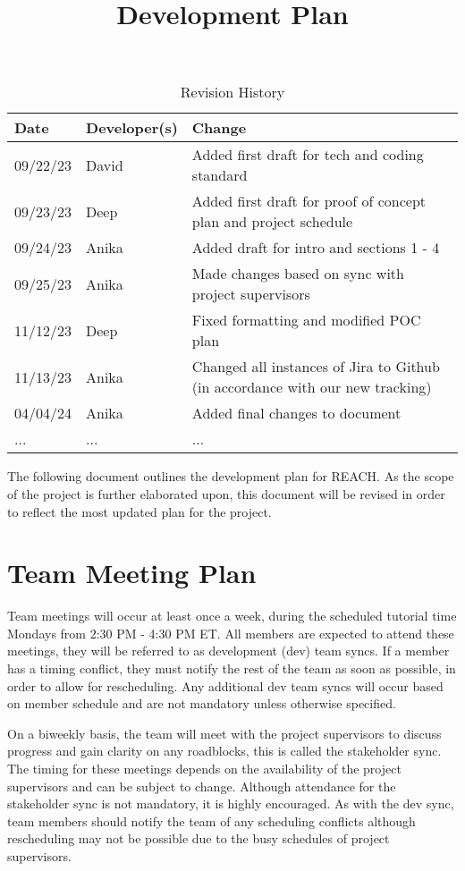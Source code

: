 \documentclass{article}
\title{Development Plan\\\progname}
\author{\authname}
\date{}
\begin{document}
\maketitle

\begin{table}[hp]
\caption{Revision History} \label{TblRevisionHistory}
\begin{tabularx}{\textwidth}{llX}
\toprule
\textbf{Date} & \textbf{Developer(s)} & \textbf{Change}\\
\midrule
09/22/23 & David & Added first draft for tech and coding standard\\
09/23/23 & Deep & Added first draft for proof of concept plan and project schedule\\
09/24/23 & Anika & Added draft for intro and sections 1 - 4 \\
09/25/23 & Anika & Made changes based on sync with project supervisors \\
11/12/23 & Deep & Fixed formatting and modified POC plan \\
11/13/23 & Anika & Changed all instances of Jira to Github (in accordance with our new tracking)\\
04/04/24 & Anika & Added final changes to document\\
... & ... & ...\\
\bottomrule
\end{tabularx}
\end{table}

\noindent The following document outlines the development plan for REACH.
As the scope of the project is further elaborated upon, 
this document will be revised in order to reflect the most updated plan for the project.

\section{Team Meeting Plan} 
Team meetings will occur at least once a week, during the scheduled tutorial time Mondays from 2:30 PM - 4:30 PM ET.
All members are expected to attend these meetings, they will be referred to as development (dev) team syncs. 
If a member has a timing conflict, they must notify the rest of the team as soon as possible, in order to allow for rescheduling.
Any additional dev team syncs will occur based on member schedule and are not mandatory unless otherwise specified.

On a biweekly basis, the team will meet with the project supervisors to discuss progress and gain clarity on any roadblocks, this is called the stakeholder sync. 
The timing for these meetings depends on the availability of the project supervisors and can be subject to change. 
Although attendance for the stakeholder sync is not mandatory, it is highly encouraged. 
As with the dev sync, team members should notify the team of any scheduling conflicts although rescheduling may not be possible due to the busy schedules of project supervisors.
\end{document}
